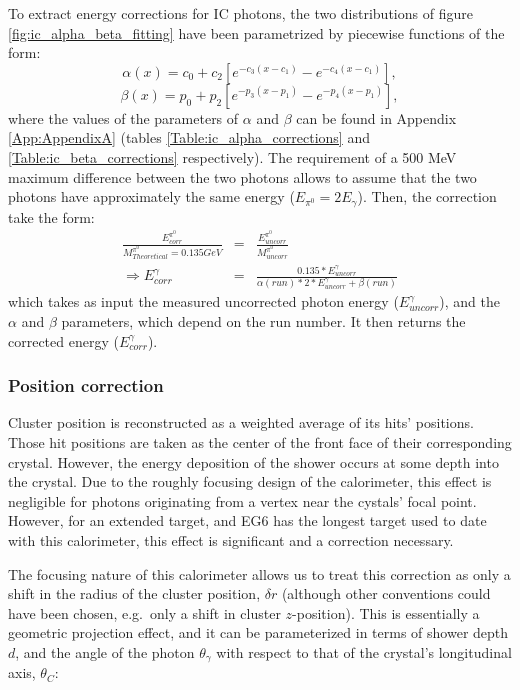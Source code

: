  To extract energy corrections for IC photons, the two distributions of figure \ref{fig:ic_alpha_beta_fitting} have been parametrized by piecewise functions of the form:
\begin{equation}
\alpha (x) = c_{0} + c_{2} \left[ e^{-c_{3}(x - c_{1})} - e^{-c_{4}(x - c_{1})} \right],
\end{equation}
\begin{equation}
\beta (x) = p_{0} + p_{2} \left[ e^{-p_{3}(x - p_{1})} - e^{-p_{4}(x - p_{1})} \right],
\end{equation}
where the values of the parameters of $\alpha$ and $\beta$ can be found in Appendix \ref{App:AppendixA} (tables \ref{Table:ic_alpha_corrections} and \ref{Table:ic_beta_corrections} respectively). The requirement of a 500 MeV maximum difference between the two photons allows to assume that the two photons have approximately the same energy ($E_{\pi^{0}} = 2 E_{\gamma}$). Then, the correction take the form:
\begin{eqnarray}
\frac{E^{\pi^{0}}_{corr}}{M^{\pi^{0}}_{Theoretical} = 0.135 GeV} &=& \frac{E^{\pi^{0}}_{uncorr}}{M^{\pi^{0}}_{uncorr}}\\ 
\Longrightarrow
E^{\gamma}_{corr} &=& \frac{0.135*E^{\gamma}_{uncorr}}{\alpha(run)*2*E^{\gamma}_{uncorr} + \beta(run)}
\label{ic_corrrection_formula}
\end{eqnarray}
which takes as input the measured uncorrected photon energy ($E^{\gamma}_{uncorr}$), and the $\alpha$ and $\beta$ parameters, which depend on the run number. It then returns the corrected energy ($E^{\gamma}_{corr}$).

\subsubsection{Position correction}
Cluster position is reconstructed as a weighted average of its hits' positions.  Those hit positions are taken as the center of the front face of their corresponding crystal.  However, the energy deposition of the shower occurs at some depth into the crystal.  Due to the roughly focusing design of the calorimeter, this effect is negligible for photons originating from a vertex near the cystals' focal point.  However, for an extended target, and EG6 has the longest target used to date with this calorimeter, this effect is significant and a correction necessary.

The focusing nature of this calorimeter allows us to treat this correction as only a shift in the radius of the cluster position, $\delta r$ (although other conventions could have been chosen, e.g.~only a shift in cluster $z$-position).  This is essentially a geometric projection effect, and it can be parameterized in terms of shower depth $d$, and the angle of the photon $\theta_\gamma$ with respect to that of the crystal's longitudinal axis, $\theta_C$:

